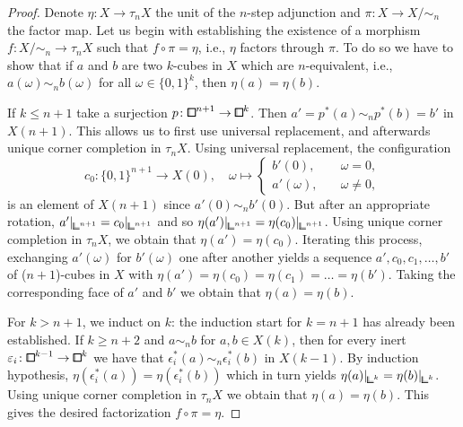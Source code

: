 \begin{proof}
Denote $\eta\colon X\to\tau_n X$ the unit of the $n$-step adjunction and $\pi\colon X\to X/\sim_n$ the factor map.
Let us begin with establishing the existence of a morphism $f\colon X/\sim_n\to\tau_n X$ such that $f\circ\pi = \eta$, i.e., $\eta$ factors through $\pi$.
To do so we have to show that if $a$ and $b$ are two $k$-cubes in $X$ which are $n$-equivalent, i.e., $a(\omega)\sim_n b(\omega)$ for all $\omega\in\{0,1\}^k$,
then $\eta(a) = \eta(b)$.

If $k\leq n+1$ take a surjection $p\colon{\bbox}^{n+1}\to{\bbox}^k$.
Then $a' = p^\ast(a)\sim_n p^\ast(b) = b'$ in $X(n+1)$.
This allows us to first use universal replacement, and afterwards unique corner completion in $\tau_n X$.
Using universal replacement, the configuration
\[
    c_0\colon\{0,1\}^{n+1}\to X(0),\quad\omega\mapsto\begin{cases}
        b'(0),\quad &\omega = 0, \\
        a'(\omega),\quad &\omega\neq 0,
    \end{cases}
\]
is an element of $X(n+1)$ since $a'(0)\sim_n b'(0)$.
But after an appropriate rotation, $a'\rvert_{{\bbcor}^{n+1}} = c_0\rvert_{{\bbcor}^{n+1}}$
and so $\eta(a')\rvert_{{\bbcor}^{n+1}} = \eta(c_0)\rvert_{{\bbcor}^{n+1}}$.
Using unique corner completion in $\tau_n X$, we obtain that $\eta(a') = \eta(c_0)$.
Iterating this process, exchanging $a'(\omega)$ for $b'(\omega)$ one after another yields a sequence $a',c_0,c_1,\ldots,b'$ of ($n+1$)-cubes in $X$
with $\eta(a') = \eta(c_0) = \eta(c_1) = \ldots = \eta(b')$.
Taking the corresponding face of $a'$ and $b'$ we obtain that $\eta(a) = \eta(b)$.

For $k>n+1$, we induct on $k$: the induction start for $k = n+1$ has already been established.
If $k \geq n+2$ and $a\sim_n b$ for $a,b\in X(k)$,
then for every inert $\epsilon_i\colon{\bbox}^{k-1}\to{\bbox}^{k}$ we have that $\epsilon_i^\ast(a) \sim_n \epsilon_i^\ast(b)$ in $X(k-1)$.
By induction hypothesis, $\eta(\epsilon_i^\ast(a)) = \eta(\epsilon_i^\ast(b))$ which in turn yields $\eta(a)\rvert_{{\bbcor}^{k}} = \eta(b)\rvert_{{\bbcor}^{k}}$.
Using unique corner completion in $\tau_n X$ we obtain that $\eta(a) = \eta(b)$.
This gives the desired factorization $f\circ\pi = \eta$.


\end{proof}
